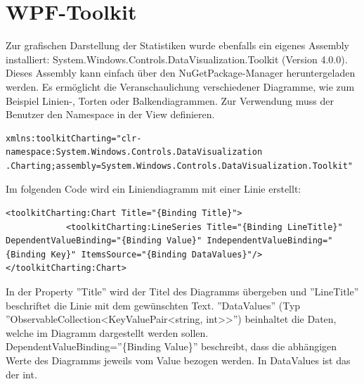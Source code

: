 \section{WPF-Toolkit}
Zur grafischen Darstellung der Statistiken wurde ebenfalls ein eigenes Assembly installiert:  System.Windows.Controls.DataVisualization.Toolkit (Version 4.0.0). Dieses Assembly kann einfach über den NuGetPackage-Manager heruntergeladen werden. Es ermöglicht die Veranschaulichung verschiedener Diagramme, wie zum Beispiel Linien-, Torten oder Balkendiagrammen. Zur Verwendung muss der Benutzer den Namespace in der View definieren.
\begin{lstlisting}
xmlns:toolkitCharting="clr-namespace:System.Windows.Controls.DataVisualization
.Charting;assembly=System.Windows.Controls.DataVisualization.Toolkit"
\end{lstlisting}
Im folgenden Code wird ein Liniendiagramm mit einer Linie erstellt:
\begin{lstlisting}
<toolkitCharting:Chart Title="{Binding Title}">
            <toolkitCharting:LineSeries Title="{Binding LineTitle}"  DependentValueBinding="{Binding Value}" IndependentValueBinding="{Binding Key}" ItemsSource="{Binding DataValues}"/>
</toolkitCharting:Chart>
\end{lstlisting}
In der Property ''Title'' wird der Titel des Diagramms übergeben und ''LineTitle'' beschriftet die Linie mit dem gewünschten Text. ''DataValues'' (Typ ''ObservableCollection\textless KeyValuePair\textless string, int\textgreater \textgreater'') beinhaltet die Daten, welche im Diagramm dargestellt werden sollen. DependentValueBinding=''\{Binding Value\}'' beschreibt, dass die abhängigen Werte des Diagramms jeweils vom Value bezogen werden. In DataValues ist das der int. 
